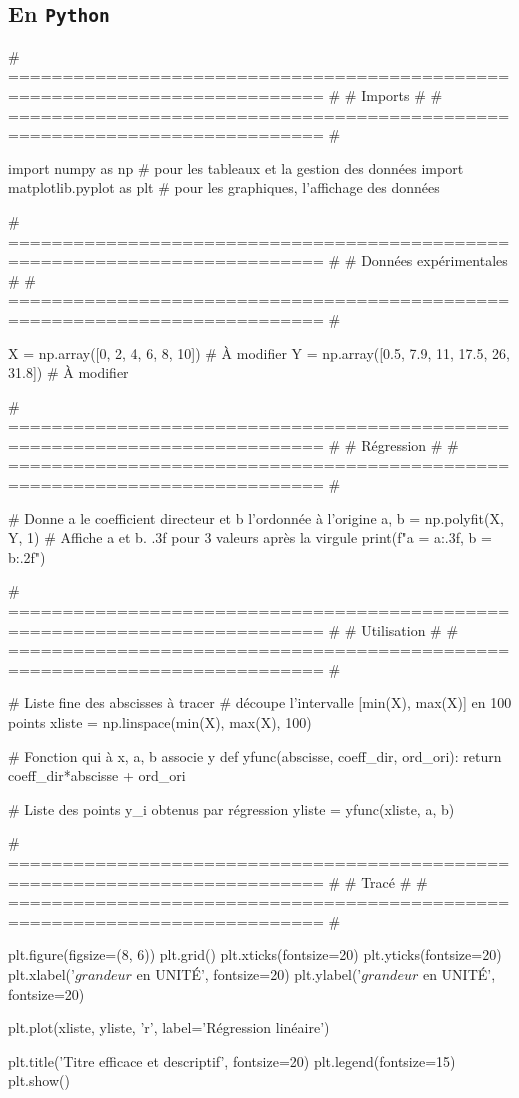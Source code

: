 \documentclass[a4paper, 12pt, garamond]{book}
\begin{document}
\subsection{En \texttt{Python}}
\begin{python}
# =========================================================================== #
#                                   Imports                                   #
# =========================================================================== #

import numpy as np               # pour les tableaux et la gestion des données
import matplotlib.pyplot as plt  # pour les graphiques, l'affichage des données

# =========================================================================== #
#                            Données expérimentales                           #
# =========================================================================== #

X = np.array([0, 2, 4, 6, 8, 10])            # À modifier
Y = np.array([0.5, 7.9, 11, 17.5, 26, 31.8]) # À modifier

# =========================================================================== #
#                                  Régression                                 #
# =========================================================================== #

# Donne a le coefficient directeur et b l'ordonnée à l'origine
a, b = np.polyfit(X, Y, 1)
# Affiche a et b. .3f pour 3 valeurs après la virgule
print(f"a = {a:.3f}, b = {b:.2f}")

# =========================================================================== #
#                                 Utilisation                                 #
# =========================================================================== #

# Liste fine des abscisses à tracer
# découpe l'intervalle [min(X), max(X)] en 100 points
xliste = np.linspace(min(X), max(X), 100)

# Fonction qui à x, a, b associe y
def yfunc(abscisse, coeff_dir, ord_ori):
return coeff_dir*abscisse + ord_ori

# Liste des points y_i obtenus par régression
yliste = yfunc(xliste, a, b)

# =========================================================================== #
#                                    Tracé                                    #
# =========================================================================== #

plt.figure(figsize=(8, 6))
plt.grid()
plt.xticks(fontsize=20)
plt.yticks(fontsize=20)
plt.xlabel('$grandeur$ en UNITÉ', fontsize=20)
plt.ylabel('$grandeur$ en UNITÉ', fontsize=20)

plt.plot(xliste, yliste,
'r', label='Régression linéaire')

plt.title('Titre efficace et descriptif', fontsize=20)
plt.legend(fontsize=15)
plt.show()
\end{python}
\end{document}

